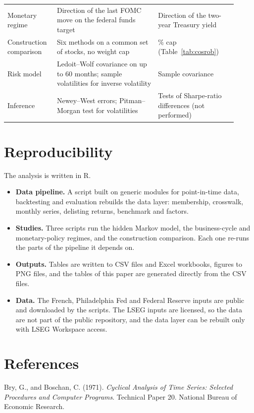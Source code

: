 \documentclass[11pt,a4paper]{article}
\begin{document}
{\begin{longtable}{>{\raggedright\arraybackslash}p{0.19\linewidth}>{\raggedright\arraybackslash}p{0.41\linewidth}>{\raggedright\arraybackslash}p{0.32\linewidth}}
Monetary regime & Direction of the last FOMC move on the federal funds target & Direction of the two-year Treasury yield \\
Construction comparison & Six methods on a common set of stocks, no weight cap & 5\% cap (Table~\ref{tab:cosrob}) \\
Risk model & Ledoit--Wolf covariance on up to 60 months; sample volatilities for inverse volatility & Sample covariance \\
Inference & Newey--West errors; Pitman--Morgan test for volatilities & Tests of Sharpe-ratio differences (not performed) \\
\end{longtable}
}

\section{Reproducibility}

The analysis is written in R.
\begin{itemize}
\item \textbf{Data pipeline.} A script built on generic modules for point-in-time data, backtesting and evaluation rebuilds the data layer: membership, crosswalk, monthly series, delisting returns, benchmark and factors.
\item \textbf{Studies.} Three scripts run the hidden Markov model, the business-cycle and monetary-policy regimes, and the construction comparison. Each one re-runs the parts of the pipeline it depends on.
\item \textbf{Outputs.} Tables are written to CSV files and Excel workbooks, figures to PNG files, and the tables of this paper are generated directly from the CSV files.
\item \textbf{Data.} The French, Philadelphia Fed and Federal Reserve inputs are public and downloaded by the scripts. The LSEG inputs are licensed, so the data are not part of the public repository, and the data layer can be rebuilt only with LSEG Workspace access.
\end{itemize}

\section*{References}
\begingroup
\small
\setlength{\parindent}{-1.5em}\setlength{\leftskip}{1.5em}\setlength{\parskip}{3pt}

Bry, G., and Boschan, C. (1971). \emph{Cyclical Analysis of Time Series: Selected Procedures and Computer Programs}. Technical Paper 20. National Bureau of Economic Research.
\end{document}

